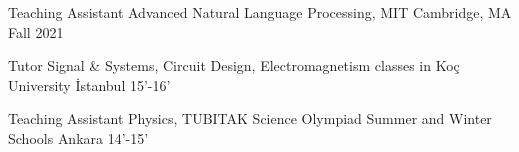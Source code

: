 \begin{cvhonors}


    

    
  \cvhonor
    {Teaching Assistant} %
    {Advanced Natural Language Processing, MIT } %
    {Cambridge, MA} %
    {Fall 2021} %
    
  \cvhonor
    {Tutor} %
    {Signal \& Systems, Circuit Design, Electromagnetism classes in Koç University} %
    {İstanbul} %
    {15'-16'} %
    

  \cvhonor
    {Teaching Assistant} %
    {Physics, TUBITAK Science Olympiad Summer and Winter Schools} %
    {Ankara} %
    {14'-15'} %

\end{cvhonors}
